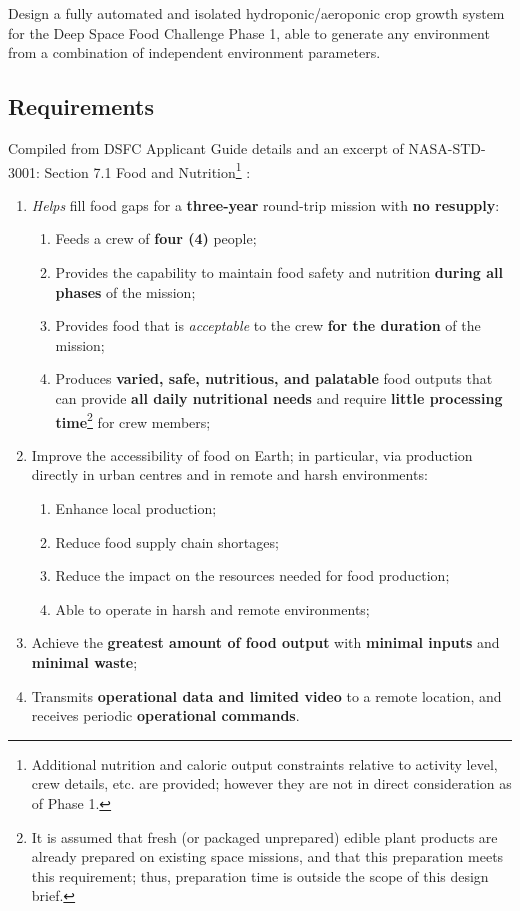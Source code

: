 \documentclass{report}
\begin{document}
Design a fully automated and isolated hydroponic/aeroponic crop growth system for the 
Deep Space Food Challenge Phase 1\cite{dsfc}, able to generate any environment from a 
combination of independent environment parameters.

\subsection{Requirements}
\label{sec:requirements}

Compiled from DSFC Applicant Guide details \cite{applicantguide} and an excerpt of NASA-STD-3001: Section 7.1 Food and Nutrition\footnote{Additional nutrition and caloric output constraints relative to activity level, crew details, etc. are provided; however they are not in direct consideration as of Phase 1.} \cite{nutrition}:
\begin{enumerate}
    \item \textit{Helps} fill food gaps for a \textbf{three-year} round-trip mission with 
    \textbf{no resupply}:
    \begin{enumerate}
        \item Feeds a crew of \textbf{four (4)} people;
        \item Provides the capability to maintain food safety and nutrition \textbf{during all phases} of the mission;
        \item Provides food that is \textit{acceptable} to the crew \textbf{for the duration} of the mission;
        \item Produces \textbf{varied, safe, nutritious, and palatable} food outputs that 
        can provide \textbf{all 
        daily nutritional needs} and require \textbf{little processing time}\footnote{It is 
        assumed that fresh (or packaged unprepared) edible plant products are already 
        prepared on existing space missions, and that this preparation meets this requirement; 
        thus, preparation time is outside the scope of this design brief.} for crew members;
    \end{enumerate}
    \item Improve the accessibility of food on Earth; in particular, via production 
    directly in urban centres and in remote and harsh environments:
    \begin{enumerate}
        \item Enhance local production;
        \item Reduce food supply chain shortages;
        \item Reduce the impact on the resources needed for food production;
        \item Able to operate in harsh and remote environments;
    \end{enumerate}
    \item Achieve the \textbf{greatest amount of food output} with \textbf{minimal inputs} and \textbf{minimal waste};
    \item Transmits \textbf{operational data and limited video} to a remote location, and receives periodic \textbf{operational commands}.
\end{enumerate}
\end{document}
